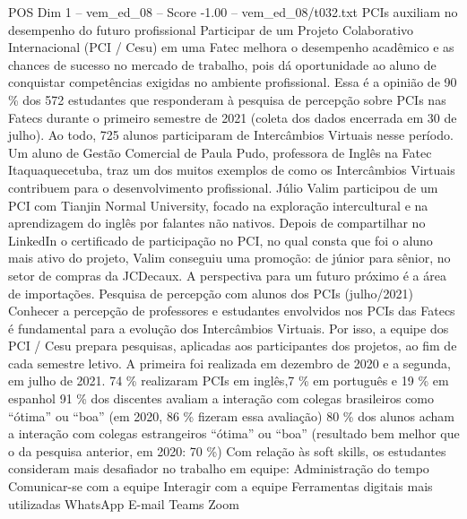 \begin{textsample}{POS Dim 1 – vem\_ed\_08 – Score -1.00 – vem\_ed\_08/t032.txt}  \label{ex:f1_pos_068}
PCIs auxiliam no desempenho do futuro profissional Participar de um Projeto Colaborativo Internacional (PCI / Cesu) em uma Fatec melhora o desempenho acadêmico e as chances de sucesso no mercado de trabalho, pois dá oportunidade ao aluno de conquistar competências exigidas no ambiente profissional.
Essa é a opinião de 90 \% dos 572 estudantes que responderam à pesquisa de percepção sobre PCIs nas Fatecs durante o primeiro semestre de 2021 (coleta dos dados encerrada em 30 de julho).
Ao todo, 725 alunos participaram de Intercâmbios Virtuais nesse período.
Um aluno de Gestão Comercial de Paula Pudo, professora de Inglês na Fatec Itaquaquecetuba, traz um dos muitos exemplos de como os Intercâmbios Virtuais contribuem para o desenvolvimento profissional.
Júlio Valim participou de um PCI com Tianjin Normal University, focado na exploração intercultural e na aprendizagem do inglês por falantes não nativos.
Depois de compartilhar no LinkedIn o certificado de participação no PCI, no qual consta que foi o aluno mais ativo do projeto, Valim conseguiu uma promoção: de júnior para sênior, no setor de compras da JCDecaux.
A perspectiva para um futuro próximo é a área de importações.
Pesquisa de percepção com alunos dos PCIs (julho/2021) Conhecer a percepção de professores e estudantes envolvidos nos PCIs das Fatecs é fundamental para a evolução dos Intercâmbios Virtuais.
Por isso, a equipe dos PCI / Cesu prepara pesquisas, aplicadas aos participantes dos projetos, ao fim de cada semestre letivo.
A primeira foi realizada em dezembro de 2020 e a segunda, em julho de 2021. 74 \% realizaram PCIs em inglês,7 \% em português e 19 \% em espanhol 91 \% dos discentes avaliam a interação com colegas brasileiros como “ótima” ou “boa” (em 2020, 86 \% fizeram essa avaliação) 80 \% dos alunos acham a interação com colegas estrangeiros “ótima” ou “boa” (resultado bem melhor que o da pesquisa anterior, em 2020: 70 \%) Com relação às soft skills, os estudantes consideram mais desafiador no trabalho em equipe: Administração do tempo Comunicar-se com a equipe Interagir com a equipe Ferramentas digitais mais utilizadas WhatsApp E-mail Teams Zoom

\end{textsample}
